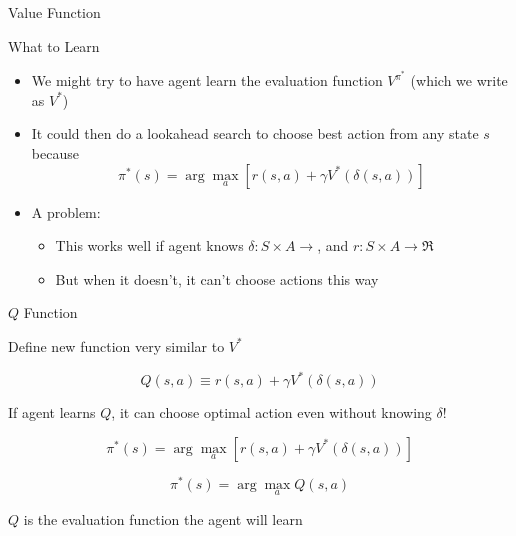 \documentclass[%
pdf,
colorBG,
slideColor,
tcrico,
]{prosper}
\begin{document}
\begin{slide}{Value Function } 

\begin{figure}
	\centering
\end{figure}




\end{slide}



\begin{slide}{What to Learn } 


\begin{itemize}
\item We might try to have agent learn the evaluation function $V^{\pi^{*}}$ (which we write as $V^*$)

\item  It could then do a lookahead search to choose best action from any state $s$ because
\[ \pi^{*}(s) = \arg\max_{a} [r(s,a) + \gamma V^{*}(\delta(s,a))] \]

\item A problem:
\begin{itemize}
\item This works well if agent knows $\delta: S \times A \rightarrow$, and $r : S
\times A \rightarrow \Re$
\item But when it doesn't, it can't choose actions this way
\end{itemize}
\end{itemize}
\end{slide}


\begin{slide}{$Q$ Function } 

Define new function very similar to $V^*$

\[ Q(s,a) \equiv r(s,a) + \gamma V^{*}(\delta(s,a)) \]

If agent learns $Q$, it can choose optimal action even without knowing
$\delta$!

\[ \pi^{*}(s) = \arg\max_{a} [r(s,a) + \gamma V^{*}(\delta(s,a))] \]

\[ \pi^{*}(s) = \arg\max_{a} Q(s,a) \]

$Q$ is the evaluation function the agent will learn
\end{slide}
\end{document}
